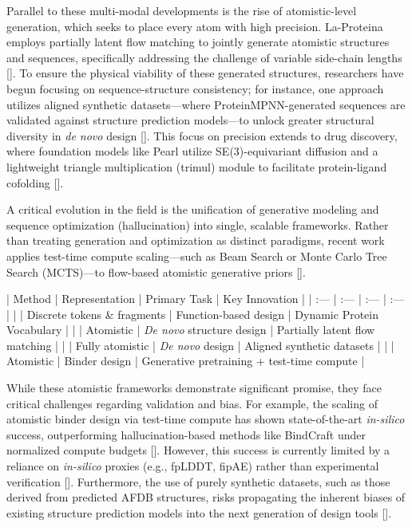 \documentclass[11pt]{article}
\begin{document}
Parallel to these multi-modal developments is the rise of atomistic-level generation, which seeks to place every atom with high precision. La-Proteina employs partially latent flow matching to jointly generate atomistic structures and sequences, specifically addressing the challenge of variable side-chain lengths [\citep{2507.09466}]. To ensure the physical viability of these generated structures, researchers have begun focusing on sequence-structure consistency; for instance, one approach utilizes aligned synthetic datasets—where ProteinMPNN-generated sequences are validated against structure prediction models—to unlock greater structural diversity in \textit{de novo} design [\citep{2512.01976}]. This focus on precision extends to drug discovery, where foundation models like Pearl utilize SE(3)-equivariant diffusion and a lightweight triangle multiplication (trimul) module to facilitate protein-ligand cofolding [\citep{2510.24670}].

A critical evolution in the field is the unification of generative modeling and sequence optimization (hallucination) into single, scalable frameworks. Rather than treating generation and optimization as distinct paradigms, recent work applies test-time compute scaling—such as Beam Search or Monte Carlo Tree Search (MCTS)—to flow-based atomistic generative priors [\citep{2603.27950}].

| Method | Representation | Primary Task | Key Innovation |
| :--- | :--- | :--- | :--- |
| \citep{2505.18966} | Discrete tokens \& fragments | Function-based design | Dynamic Protein Vocabulary |
| \citep{2507.09466} | Atomistic | \textit{De novo} structure design | Partially latent flow matching |
| \citep{2512.01976} | Fully atomistic | \textit{De novo} design | Aligned synthetic datasets |
| \citep{2603.27950} | Atomistic | Binder design | Generative pretraining + test-time compute |

While these atomistic frameworks demonstrate significant promise, they face critical challenges regarding validation and bias. For example, the scaling of atomistic binder design via test-time compute has shown state-of-the-art \textit{in-silico} success, outperforming hallucination-based methods like BindCraft under normalized compute budgets [\citep{2603.27950}]. However, this success is currently limited by a reliance on \textit{in-silico} proxies (e.g., fpLDDT, fipAE) rather than experimental verification [\citep{2603.27950}]. Furthermore, the use of purely synthetic datasets, such as those derived from predicted AFDB structures, risks propagating the inherent biases of existing structure prediction models into the next generation of design tools [\citep{2603.27950}].
\end{document}
